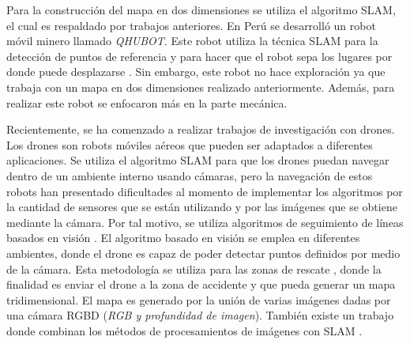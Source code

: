 Para la construcción del mapa en dos dimensiones se utiliza el algoritmo SLAM, el cual es 
respaldado por trabajos anteriores. En Perú se desarrolló un robot móvil minero
llamado \textit{QHUBOT}. Este robot utiliza la técnica SLAM para la detección de puntos
de referencia y para hacer que el robot sepa los lugares por donde puede desplazarse 
\cite{Mauricio2015}. Sin embargo, este robot no hace exploración ya que trabaja con un mapa 
en dos dimensiones realizado anteriormente. Además, para realizar este robot se enfocaron
más en la parte mecánica.


Recientemente, se ha comenzado a realizar trabajos de investigación con drones. Los drones 
son robots móviles aéreos que pueden ser adaptados a diferentes aplicaciones. Se utiliza 
el algoritmo SLAM para que los drones puedan navegar dentro de un ambiente interno usando 
cámaras, pero la navegación de estos robots han presentado dificultades al momento de implementar 
los algoritmos por la cantidad de sensores que se están utilizando y por las imágenes
que se obtiene mediante la cámara. Por tal motivo, se utiliza algoritmos de seguimiento de 
líneas basados en visión \cite{Verschoor2013}. El algoritmo basado en visión se emplea en 
diferentes ambientes, donde el drone es capaz de poder detectar puntos definidos por medio 
de la cámara. Esta metodología se utiliza para las zonas de rescate \cite{Skoda2015}, donde 
la finalidad es enviar el drone a la zona de accidente y que pueda generar un mapa 
tridimensional. El mapa es generado por la unión de varias imágenes dadas por una cámara 
RGBD (\textit{RGB y profundidad de imagen}). También existe un trabajo donde combinan 
los métodos de procesamientos de imágenes con SLAM \cite{Heukels2015}.

